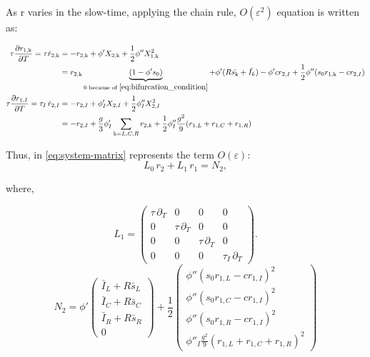 \documentclass[12,twoside]{TFG-GM}
\theoremstyle{definition}
\theoremstyle{remark}
\newcommand{\kk}{\mathrm{k}}
\begin{document}
As r varies in the slow-time, applying the chain rule, $O(\varepsilon^2)$ equation is written as:

\begin{equation}
\begin{aligned}
\tau\frac{\partial r_{1,\kk}}{\partial T} =\tau \dot{r}_{2,\kk } & = - r_{2,\kk}+ \phi'X_{2,\kk}+\frac 12 \phi'' X_{1,\kk}^2 \\ &= r_{2,\kk}\underbrace{(1-\phi's_0)}_{0 \text{ because of }\ref{eq:bifurcation_condition}} + \phi' (R\bar{s_\kk}+ \bar{I_k})- \phi'cr_{2,I} + \frac12 \phi''(s_0r_{1,\kk}-cr_{2,I})   \\
  \tau\frac{\partial r_{1,I}}{\partial T} =\tau_I\,\dot{r}_{2,I} & = -r_{2,I} + \phi'_I X_{2,I}+ \frac 12 \phi''_IX_{2,I}^2  \\&= -r_{2,I} + \frac g3\phi'_I\sum_{\kk = L,C,R}r_{2,k} + \frac 12 \phi''_I \frac{g^2}{9}(r_{1,L}+r_{1,C}+r_{1,R})
  \end{aligned}
  \label{eq:order1}
\end{equation}

Thus, in \eqref{eq:system-matrix} represents the term $O(\varepsilon)$:
\begin{equation}
  L_0\,r_2 + L_1\,r_1 = N_2,
  \label{eq:o2-matrix}
\end{equation}

where,

\begin{equation}
  L_1 = \begin{pmatrix}
    \tau\,\partial_T & 0 & 0 & 0 \\[2mm]
    0 & \tau\,\partial_T & 0 & 0 \\[2mm]
    0 & 0 & \tau\,\partial_T & 0 \\[2mm]
    0 & 0 & 0 & \tau_I\,\partial_T
  \end{pmatrix}.
  \label{eq:L1_matrix}
\end{equation}
\begin{equation}
N_2 = \phi'\begin{pmatrix}
\bar{I}_L + R\bar{s}_L \\\bar{I}_C  + R\bar{s}_C \\ 
\bar{I}_R + R\bar{s}_R \\ 
0
\end{pmatrix} + \frac{1}{2} 
\begin{pmatrix}\phi'' (s_0r_{1,L} - cr_{1,I})^2\\  
\phi''(s_0r_{1,C} - cr_{1,I})^2\\  
\phi''(s_0r_{1,R} - cr_{1,I})^2 \\ 
\phi''_I \frac{g^2}{9}(r_{1,L} +r_{1,C} + r_{1,R})^2 
\end{pmatrix}
\label{eq:N2}
\end{equation}
\end{document}
